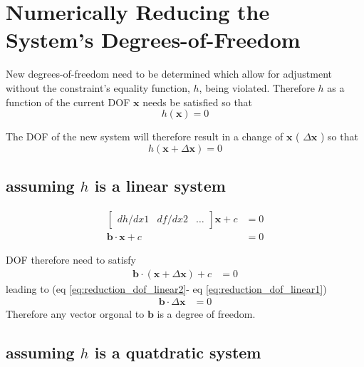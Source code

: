 \documentclass[a4paper,10pt]{article}
\begin{document}
\section{Numerically Reducing the System's Degrees-of-Freedom}

New degrees-of-freedom need to be determined which allow for adjustment without the constraint's equality function, $h$, being violated.
Therefore $h$ as a function of the current DOF $\mathbf{x}$ needs be satisfied so that
\begin{equation}
 h(\mathbf{x}) = 0
\end{equation}

The DOF of the new system will therefore result in a change of $\mathbf{x}$ ( $\Delta \mathbf{x}$ ) so that
\begin{equation}
 h(\mathbf{x} + \Delta \mathbf{x}) = 0
\end{equation}

\subsection{assuming $h$ is a linear system}

\begin{align}
    \begin{bmatrix} dh/dx1 & df/dx2 &\dots  \end{bmatrix} \mathbf{x} + c &= 0 \\
    \mathbf{b} \cdot \mathbf{x} + c &= 0 \label{eq:reduction_dof_linear1}
\end{align}

DOF therefore need to satisfy
\begin{align}
   \mathbf{b} \cdot (\mathbf{x}  + \Delta \mathbf{x}) + c &= 0 \label{eq:reduction_dof_linear2}
\end{align}   
leading to (eq  \ref{eq:reduction_dof_linear2}- eq \ref{eq:reduction_dof_linear1})
\begin{align}
   \mathbf{b} \cdot \Delta \mathbf{x} &= 0
\end{align} 
Therefore any vector orgonal to $\mathbf{b}$ is a degree of freedom.
   
\subsection{assuming $h$ is a quatdratic system}
\end{document}
